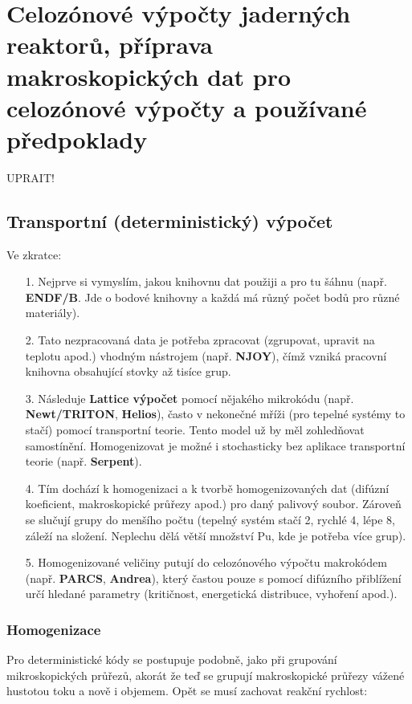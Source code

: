 \section[Celozónové výpočty]{Celozónové výpočty jaderných reaktorů, příprava makroskopických dat pro celozónové výpočty a používané předpoklady}

UPRAIT!

\subsection{Transportní (deterministický) výpočet}

Ve zkratce: 

\begin{enumerate}
  \item[1.] Nejprve si vymyslím, jakou knihovnu dat použiji a pro tu šáhnu (např. \textbf{ENDF/B}. Jde o bodové knihovny a každá má různý počet bodů pro různé materiály).
  \item[2.] Tato nezpracovaná data je potřeba zpracovat (zgrupovat, upravit na teplotu apod.) vhodným nástrojem (např. \textbf{NJOY}), čímž vzniká pracovní knihovna obsahující stovky až tisíce grup.
  \item[3.] Následuje \textbf{Lattice výpočet} pomocí nějakého mikrokódu (např. \textbf{Newt/TRITON}, \textbf{Helios}), často v nekonečné mříži (pro tepelné systémy to stačí) pomocí transportní teorie. Tento model už by měl zohledňovat samostínění. Homogenizovat je možné i stochasticky bez aplikace transportní teorie (např. \textbf{Serpent}).
  \item[4.] Tím dochází k homogenizaci a k tvorbě homogenizovaných dat (difúzní koeficient, makroskopické průřezy apod.) pro daný palivový soubor. Zároveň se slučují grupy do menšího počtu (tepelný systém stačí 2, rychlé 4, lépe 8, záleží na složení. Neplechu dělá větší množství Pu, kde je potřeba více grup).
  \item[5.] Homogenizované veličiny putují do celozónového výpočtu makrokódem (např. \textbf{PARCS}, \textbf{Andrea}), který častou pouze s pomocí difúzního přiblížení určí hledané parametry (kritičnost, energetická distribuce, vyhoření apod.).
\end{enumerate}

\subsubsection{Homogenizace}

Pro deterministické kódy se postupuje podobně, jako při grupování mikroskopických průřezů, akorát že teď se grupují makroskopické průřezy vážené hustotou toku a nově i objemem. Opět se musí zachovat reakční rychlost:

